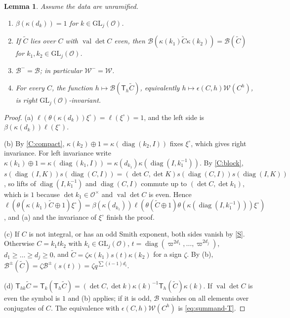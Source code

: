 \documentclass[11pt,oneside,notitlepage]{book}
\numberwithin{equation}{section}
\theoremstyle{plain}
\newtheorem{lemma}[theorem]{Lemma}
\theoremstyle{definition}
\newcommand{\cO}{\mathcal{O}}
\newcommand{\GL}{\mathrm{GL}}
\newcommand{\cW}{\mathcal{W}}
\newcommand{\cB}{\mathcal{B}}
\newcommand{\val}{\operatorname{val}}
\newcommand{\diag}{\operatorname{diag}}
\newcommand{\hil}[2]{(#1,#2)}
\newcommand{\T}{\mathsf{T}}
\begin{document}
\begin{lemma}\label{lem:compact}
Assume the data are unramified.
\begin{enumerate}[label=(\alph*)]
\item $\beta(\kappa(d_k))=1$ for $k\in\GL_j(\cO)$.
\item If $\tilde C$ lies over $C$ with $\val\det C$ even, then $\cB(\kappa(k_1)\tilde C\kappa(k_2))=\cB(\tilde C)$ for $k_1,k_2\in\GL_j(\cO)$.
\item $\cB^-=\cB$; in particular $\cW^-=\cW$.
\item For every $C$, the function $h\mapsto\cB(\T_h\tilde C)$, equivalently $h\mapsto\epsilon(C,h)\cW(C^h)$, is right $\GL_j(\cO)$-invariant.
\end{enumerate}
\end{lemma}
\begin{proof}
(a) $\ell(\theta(\kappa(d_k))\xi^\circ)=\ell(\xi^\circ)=1$, and the left side is $\beta(\kappa(d_k))\ell(\xi^\circ)$.

(b) By \ref{C:compact}, $\kappa(k_2)\oplus1=\kappa(\diag(k_2,I))$ fixes $\xi^\circ$, which gives right invariance. For left invariance write $\kappa(k_1)\oplus1=\kappa(\diag(k_1,I))=\kappa(d_{k_1})\kappa(\diag(I,k_1^{-1}))$. By \ref{C:block}, $s(\diag(I,K))s(\diag(C,I))=\hil{\det C}{\det K}s(\diag(C,I))s(\diag(I,K))$, so lifts of $\diag(I,k_1^{-1})$ and $\diag(C,I)$ commute up to $\hil{\det C}{\det k_1}$, which is $1$ because $\det k_1\in\cO^\times$ and $\val\det C$ is even. Hence $\ell(\theta(\kappa(k_1)\tilde C\oplus1)\xi^\circ)=\beta(\kappa(d_{k_1}))\ell(\theta(\tilde C\oplus1)\theta(\kappa(\diag(I,k_1^{-1})))\xi^\circ)$, and (a) and the invariance of $\xi^\circ$ finish the proof.

(c) If $C$ is not integral, or has an odd Smith exponent, both sides vanish by \ref{S}. Otherwise $C=k_1tk_2$ with $k_i\in\GL_j(\cO)$, $t=\diag(\varpi^{2d_1},\dots,\varpi^{2d_j})$, $d_1\ge\dots\ge d_j\ge0$, and $\tilde C=\zeta\kappa(k_1)s(t)\kappa(k_2)$ for a sign $\zeta$. By (b), $\cB^\pm(\tilde C)=\zeta\cB^\pm(s(t))=\zeta q^{\sum(i-1)d_i}$.

(d) $\T_{hk}\tilde C=\T_k(\T_h\tilde C)=\hil{\det C}{\det k}\kappa(k)^{-1}\T_h(\tilde C)\kappa(k)$. If $\val\det C$ is even the symbol is $1$ and (b) applies; if it is odd, $\cB$ vanishes on all elements over conjugates of $C$. The equivalence with $\epsilon(C,h)\cW(C^h)$ is \eqref{eq:summand-T}.
\end{proof}
\end{document}
